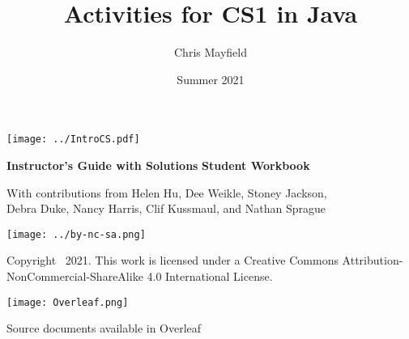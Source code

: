 \documentclass[12pt,twoside,openright]{report}
\title{Activities for CS1 in Java}
\author{Chris Mayfield}
\date{Summer 2021}
\begin{document}
\setcounter{page}{1}

\begin{titlepage}
\null\vfill
\centering

\texttt{[image: ../IntroCS.pdf]}

\makeatletter

\vspace*{4em}
\huge \textbf{\@title}

\vspace*{2pt}
\ifdefined\Teacher
\color{DarkRed}
\Large \textbf{Instructor's Guide with Solutions}
\else
\color{ForestGreen}
\Large \textbf{Student Workbook}
\fi
\normalcolor

\vspace*{2em}
\large \@author

\vspace*{4pt}
\small With contributions from Helen Hu, Dee Weikle, Stoney Jackson, \\ Debra Duke, Nancy Harris, Clif Kussmaul, and Nathan Sprague

\vspace*{2em}
\Large \@date

\makeatother

\normalsize

\vspace*{4em}
\texttt{[image: ../by-nc-sa.png]}

\vspace*{1ex}
Copyright \textcopyright\ 2021.
This work is licensed under a Creative Commons Attribution-NonCommercial-ShareAlike 4.0 International License.

\ifdefined\Teacher
\vspace*{2em}
\texttt{[image: Overleaf.png]}

\vspace*{1ex}
Source documents available in Overleaf
\fi

\vfill\null
\end{titlepage}

\cleardoublepage
{}


\cleardoublepage
{}
\tableofcontents
{}
\cleardoublepage

\pagestyle{plain}
\setcounter{page}{1}

\newcommand{\mod}[1]{\hspace*{1.5em}Model~#1~~}
\end{document}
